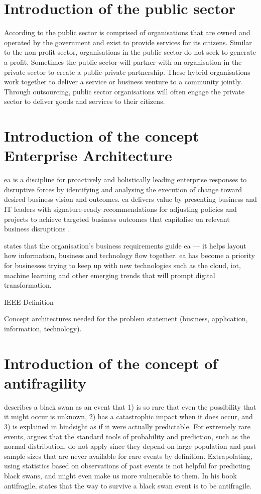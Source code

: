 \section{Introduction of the public sector}
\label{sec:intropublicsector}
According to \textcite{PrivacySense2016} the public sector is comprised of organisations that are owned and operated by the government and exist to provide services for its citizens. Similar to the non-profit sector, organisations in the public sector do not seek to generate a profit. Sometimes the public sector will partner with an organisation in the private sector to create a public-private partnership. These hybrid organisations work together to deliver a service or business venture to a community jointly. Through outsourcing, public sector organisations will often engage the private sector to deliver goods and services to their citizens.

\section{Introduction of the concept Enterprise Architecture}
\label{introea}
\acrfull{ea} is a discipline for proactively and holistically leading enterprise responses to disruptive forces by identifying and analysing the execution of change toward desired business vision and outcomes. \acrshort{ea} delivers value by presenting business and IT leaders with signature-ready recommendations for adjusting policies and projects to achieve targeted business outcomes that capitalise on relevant business disruptions \parencite{Gartner}.

\textcite{White2018} states that the organisation’s business requirements guide \acrshort{ea} — it helps layout how information, business and technology flow together. \acrshort{ea} has become a priority for businesses trying to keep up with new technologies such as the cloud, \acrfull{iot}, machine learning and other emerging trends that will prompt digital transformation.

IEEE Definition

Concept architectures needed for the problem statement (business, application, information, technology).

\section{Introduction of the concept of antifragility}
\label{sec:introantifragility}
\textcite{Taleb2008} describes a black swan as an event that 1) is so rare that even the possibility that it might occur is unknown, 2) has a catastrophic impact when it does occur, and 3) is explained in hindsight as if it were actually predictable. For extremely rare events, \citeauthor{Taleb2008} argues that the standard tools of probability and prediction, such as the normal distribution, do not apply since they depend on large population and past sample sizes that are never available for rare events by definition. Extrapolating, using statistics based on observations of past events is not helpful for predicting black swans, and might even make us more vulnerable to them. In his book \Gls{antifragile}, \textcite{Taleb2012} states that the way to survive a black swan event is to be \gls{antifragile}.


